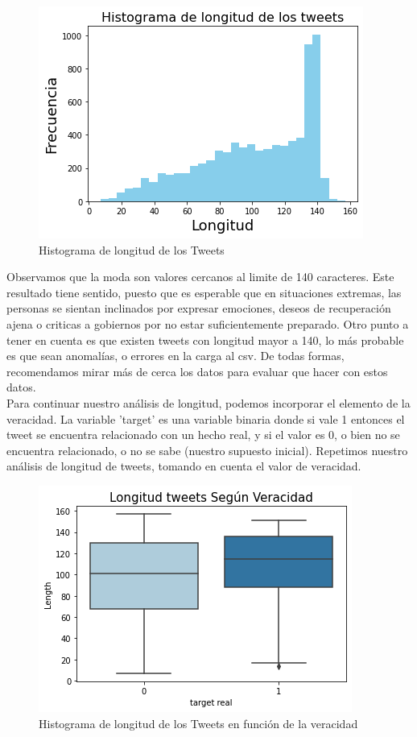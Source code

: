 \documentclass[]{article}
\begin{document}
 \begin{figure}[H]
	\centering
	\includegraphics[width=0.75\linewidth]{longitud}
	\caption[]{Histograma de longitud de los Tweets}
\end{figure}

Observamos que la moda son valores cercanos al limite de 140 caracteres. Este resultado tiene sentido, puesto que es esperable que en situaciones extremas, las personas se sientan inclinados por expresar emociones, deseos de recuperación ajena o criticas a gobiernos por no estar suficientemente preparado. Otro punto a tener en cuenta es que existen tweets con longitud mayor a 140, lo m\'as probable es que sean anomal\'ias, o errores en la carga al csv. De todas formas, recomendamos mirar m\'as de cerca los datos para evaluar que hacer con estos datos.\\

Para continuar nuestro an\'alisis de longitud, podemos incorporar el elemento de la veracidad. La variable 'target' es una variable binaria donde si vale 1 entonces el tweet se encuentra relacionado con un hecho real, y si el valor es 0, o bien no se encuentra relacionado, o no se sabe (nuestro supuesto inicial). Repetimos nuestro an\'alisis de longitud de tweets, tomando en cuenta el valor de veracidad. 

 \begin{figure}[H]
	\centering
	\includegraphics[width=0.75\linewidth]{longitud2}
	\caption[]{Histograma de longitud de los Tweets en funci\'on de la veracidad}
\end{figure}
\end{document}
